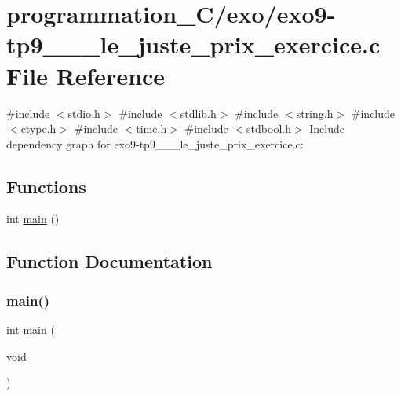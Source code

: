 \hypertarget{exo9-tp9__4__8__le__juste__prix__exercice_8c}{}\section{programmation\+\_\+\+C/exo/exo9-\/tp9\+\_\+\_\+\_\+le\+\_\+juste\+\_\+prix\+\_\+exercice.c File Reference}
\label{exo9-tp9__4__8__le__juste__prix__exercice_8c}
{\ttfamily \#include $<$stdio.\+h$>$}\newline
{\ttfamily \#include $<$stdlib.\+h$>$}\newline
{\ttfamily \#include $<$string.\+h$>$}\newline
{\ttfamily \#include $<$ctype.\+h$>$}\newline
{\ttfamily \#include $<$time.\+h$>$}\newline
{\ttfamily \#include $<$stdbool.\+h$>$}\newline
Include dependency graph for exo9-\/tp9\+\_\+\_\+\_\+le\+\_\+juste\+\_\+prix\+\_\+exercice.c\+:
\subsection*{Functions}
\begin{DoxyCompactItemize}
\item 
int \hyperlink{exo9-tp9__4__8__le__juste__prix__exercice_8c_ae66f6b31b5ad750f1fe042a706a4e3d4}{main} ()
\end{DoxyCompactItemize}


\subsection{Function Documentation}
\mbox{\label{exo9-tp9__4__8__le__juste__prix__exercice_8c_ae66f6b31b5ad750f1fe042a706a4e3d4}} 
\subsubsection{\texorpdfstring{main()}{main()}}
{\footnotesize\ttfamily int main (\begin{DoxyParamCaption}\item[{void}]{ }\end{DoxyParamCaption})}

